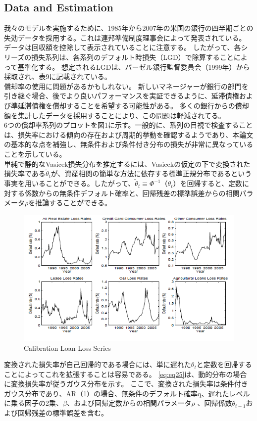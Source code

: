 \documentclass[a4j,12pt]{jarticle}
\begin{document}
\subsection{Data and Estimation}
我々のモデルを実施するために、1985年から2007年の米国の銀行の四半期ごとの失効データを採用する。これは連邦準備制度理事会によって発表されている。 データは回収額を控除して表示されていることに注意する。 したがって、各シリーズの損失系列は、各系列のデフォルト時損失（LGD）で除算することによって基準化する。 想定されるLGDは、バーゼル銀行監督委員会（1999年）から採取され、表9に記載されている。\\
償却率の使用に問題があるかもしれない。 新しいマネージャーが銀行の部門を引き継ぐ場合、後でより良いパフォーマンスを実証できるように、延滞債権および準延滞債権を償却することを希望する可能性がある。 多くの銀行からの償却額を集計したデータを採用することにより、この問題は軽減されてる。\\
6つの償却率系列のプロットを図1に示す。一般的に、系列の目視で検査することは、損失率における傾向の存在および周期的挙動を確認するようであり、本論文の基本的な点を補強し、無条件および条件付き分布の損失が非常に異なっていることを示している。\\
単純で静的なVasicek損失分布を推定するには、Vasicekの仮定の下で変換された損失率である$\tilde{\theta}_t$が、資産相関の簡単な方法に依存する標準正規分布であるという事実を用いることができる。したがって、$\tilde{\theta}_t\equiv\Phi^{-1}（\theta_t）$を回帰すると、定数に対する係数からの無条件デフォルト確率と、回帰残差の標準誤差からの相関パラメータ$\rho$を推論することができる。
\begin{figure}[H]
\includegraphics{figure/ch1.png}
\caption{Calibration Loan Loss Series}
\end{figure}
変換された損失率が自己回帰的である場合には、単に遅れた$\theta_t$と定数を回帰することによってこれを拡張することは容易である。 \eqref{eq:eq25}は、動的分布の場合に変換損失率が従うガウス分布を示す。 ここで、変換された損失率は条件付きガウス分布であり、AR（1）の場合、無条件のデフォルト確率q、遅れたレベルに乗る因子の2乗、$\beta$、および回帰定数からの相関パラメータ$\rho$ 、回帰係数$\theta_{t-1}$および回帰残差の標準誤差を含む。
\end{document}
